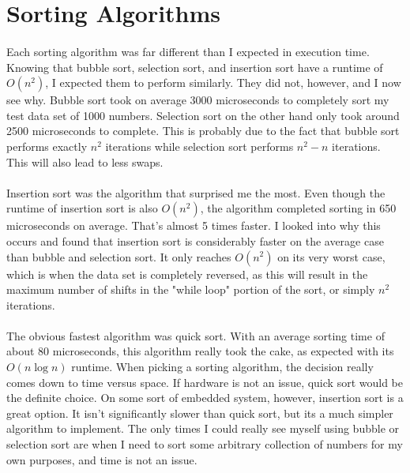 \documentclass[12pt]{article}
\begin{document}
\maketitle

\section{Sorting Algorithms}

\paragraph{}
Each sorting algorithm was far different than I expected in execution time.  Knowing that bubble sort, selection sort, and insertion sort have a runtime of $O(n^{2})$, I expected them to perform similarly.  They did not, however, and I now see why.  Bubble sort took on average 3000 microseconds to completely sort my test data set of 1000 numbers.  Selection sort on the other hand only took around 2500 microseconds to complete.  This is probably due to the fact that bubble sort performs exactly $n^{2}$ iterations while selection sort performs $n^{2}-n$ iterations.  This will also lead to less swaps.

\paragraph{}
Insertion sort was the algorithm that surprised me the most. Even though the runtime of insertion sort is also $O(n^{2})$, the algorithm completed sorting in 650 microseconds on average.  That's almost 5 times faster.  I looked into why this occurs and found that insertion sort is considerably faster on the average case than bubble and selection sort.  It only reaches $O(n^{2})$ on its very worst case, which is when the data set is completely reversed, as this will result in the maximum number of shifts in the "while loop" portion of the sort, or simply $n^{2}$ iterations.

\paragraph{}
The obvious fastest algorithm was quick sort.  With an average sorting time of about 80 microseconds, this algorithm really took the cake, as expected with its $O(n\log n)$ runtime.  When picking a sorting algorithm, the decision really comes down to time versus space.  If hardware is not an issue, quick sort would be the definite choice.  On some sort of embedded system, however, insertion sort is a great option.  It isn't significantly slower than quick sort, but its a much simpler algorithm to implement.  The only times I could really see myself using bubble or selection sort are when I need to sort some arbitrary collection of numbers for my own purposes, and time is not an issue.
\end{document}
